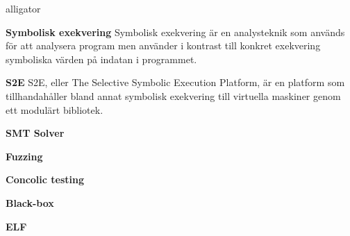 \begin{labeling}{alligator}
  \item [\textbf{Symbolisk exekvering}] Symbolisk exekvering är en analysteknik
    som används för att analysera program men använder i kontrast till konkret exekvering
    symboliska värden på indatan i programmet. 
  \item [\textbf{S2E}] S2E, eller The Selective Symbolic Execution Platform,
    är en platform som tillhandahåller bland annat symbolisk exekvering till virtuella
    maskiner genom ett modulärt bibliotek. 
  \item [\textbf{SMT Solver}] 
  \item [\textbf{Fuzzing}]   
  \item [\textbf{Concolic testing}]   
  \item [\textbf{Black-box}]   
  \item [\textbf{ELF}]   
\end{labeling}
